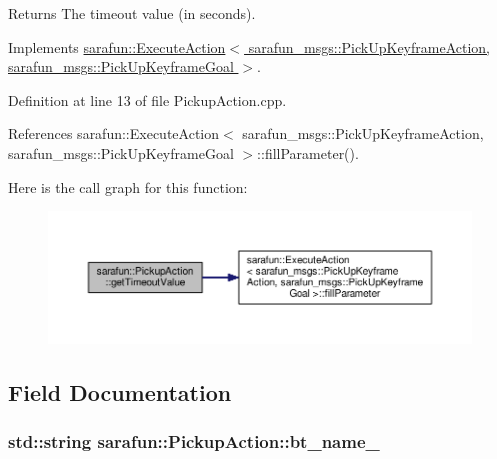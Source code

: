 \begin{DoxyReturn}{Returns}
The timeout value (in seconds). 
\end{DoxyReturn}


Implements \hyperlink{classsarafun_1_1ExecuteAction_aba6cfa8a8ce19e735eb6394424df6d17_aba6cfa8a8ce19e735eb6394424df6d17}{sarafun\-::\-Execute\-Action$<$ sarafun\-\_\-msgs\-::\-Pick\-Up\-Keyframe\-Action, sarafun\-\_\-msgs\-::\-Pick\-Up\-Keyframe\-Goal $>$}.



Definition at line 13 of file Pickup\-Action.\-cpp.



References sarafun\-::\-Execute\-Action$<$ sarafun\-\_\-msgs\-::\-Pick\-Up\-Keyframe\-Action, sarafun\-\_\-msgs\-::\-Pick\-Up\-Keyframe\-Goal $>$\-::fill\-Parameter().



Here is the call graph for this function\-:
\nopagebreak
\begin{figure}[H]
\begin{center}
\leavevmode
\includegraphics[width=350pt]{d8/dba/classsarafun_1_1PickupAction_a02643cdc836095102e5622b660233f26_a02643cdc836095102e5622b660233f26_cgraph}
\end{center}
\end{figure}




\subsection{Field Documentation}
\hypertarget{classsarafun_1_1PickupAction_a67b2fdfacb038bcd76dca5a3c2c2077c_a67b2fdfacb038bcd76dca5a3c2c2077c}{
\subsubsection[{bt\-\_\-name\-\_\-}]{\setlength{\rightskip}{0pt plus 5cm}std\-::string sarafun\-::\-Pickup\-Action\-::bt\-\_\-name\-\_\-\hspace{0.3cm}{\ttfamily [private]}}}\label{classsarafun_1_1PickupAction_a67b2fdfacb038bcd76dca5a3c2c2077c_a67b2fdfacb038bcd76dca5a3c2c2077c}


